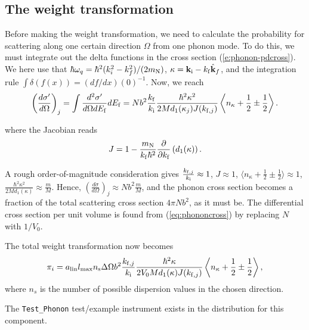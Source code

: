\subsection{The weight transformation}
Before making the weight transformation, we need to calculate the
probability for scattering along one certain direction $\Omega$
from one phonon mode. To do this, we must integrate out the delta
functions in the cross section (\ref{e:phonon-pdcross}).
We here use that $\hbar \omega_q = \hbar^2 (k_i^2 - k_f^2) / (2 m_{\rm N})$,
$\kappa = {\bf k}_{\rm i} - k_{\rm f}\hat{\bf k}_f$, and
the integration rule $\int \delta(f(x)) = (df/dx)(0)^{-1}$.
Now, we reach
\begin{equation} \label{eq:phononcross}
\left(\frac{d\sigma'}{d\Omega}\right)_j = \int \frac{d^2\sigma'}{d\Omega dE_{\rm f}} dE_{\rm f}
 = N b^2 \frac{k_{\rm f}}{k_{\rm i}}
\frac{\hbar^2 \kappa^2}{2M d_1(\kappa_j) J(k_{{\rm f},j})}
\left\langle n_{\kappa}+\frac12\pm\frac12 \right\rangle .
\end{equation}

where the Jacobian reads
\begin{equation}
J = 1 - \frac{m_{\rm N}}{k_{\rm f} \hbar^2}
    \frac{\partial}{\partial k_{\rm f}} \left( d_1(\kappa) \right) .
\end{equation}

A rough order-of-magnitude consideration gives
$\frac{k_{{\rm f},j}}{k_{\rm i}}\approx 1$,
$J \approx 1$,
$\langle n_{\kappa}+\frac12\pm\frac12 \rangle \approx 1$,
$\frac{\hbar^2\kappa^2}{2M d_1(\kappa)}
\approx \frac{m}{M}$.
Hence, $\left(\frac{d\sigma}{d\Omega}\right)_j \approx N b^2 \frac{m}{M}$, and
the phonon cross section becomes a fraction of
the total scattering cross section $4 \pi N b^2$, as it must be.
The differential cross section per unit volume is found from
(\ref{eq:phononcross}) by replacing $N$ with $1/V_0$.

The total weight transformation now becomes
\begin{equation} \label{eq:phonon_mult}
\pi_i = a_{\rm lin} l_{\rm max} n_{\rm s} \Delta \Omega
 b^2 \frac{k_{{\rm f},j}}{k_{\rm i}}
 \frac{\hbar^2 \kappa}{2 V_0 M d_1(\kappa) J(k_{{\rm f},j})}
 \left\langle n_{\kappa}+\frac12 \pm\frac12 \right\rangle ,
\end{equation}
where $n_s$ is the number of possible dispersion values in the chosen direction.

The \verb+Test_Phonon+ test/example instrument exists in the distribution for this component.
